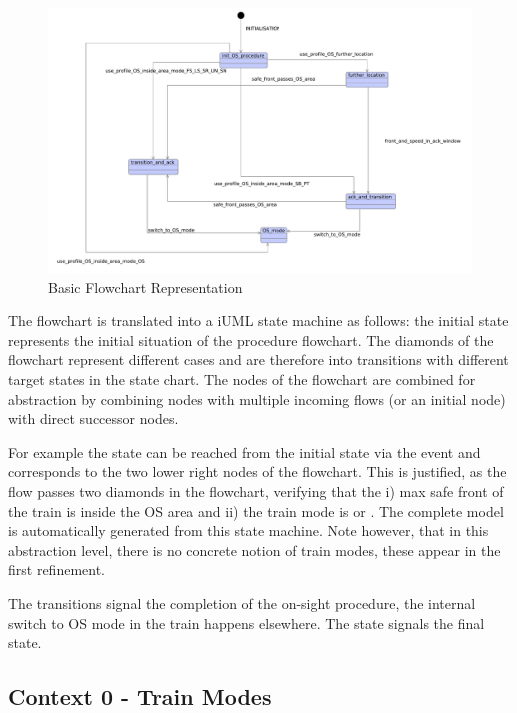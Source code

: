 \documentclass{template/openetcs_article}
\begin{document}
\begin{figure}[ht]
  \centering
  \includegraphics[width=.95\textwidth]{m0_basic_flowchart_on_sight_procedure}
  \caption{Basic Flowchart Representation}
  \label{fig:basic-flowchart}
\end{figure}

The flowchart is translated into a iUML state machine as follows: the initial
state represents the initial situation of the procedure flowchart. The diamonds
of the flowchart represent different cases and are therefore into transitions
with different target states in the state chart. The nodes of the flowchart are
combined for abstraction by combining nodes with multiple incoming flows (or an
initial node) with direct successor nodes.

For example the state  can be reached from the
initial state via the event
 and corresponds to the two
lower right nodes of the flowchart. This is justified, as the flow passes two
diamonds in the flowchart, verifying that the i) max safe front of the train is
inside the OS area and ii) the train mode is  or . The
complete model is automatically generated from this state machine. Note
however, that in this abstraction level, there is no concrete notion of train
modes, these appear in the first refinement.

The transitions  signal the completion of the
on-sight procedure, the internal switch to OS mode in the train happens
elsewhere. The state  signals the final state.

\subsection{Context 0 - Train Modes}
\label{sec:context-0-entities}
\end{document}
